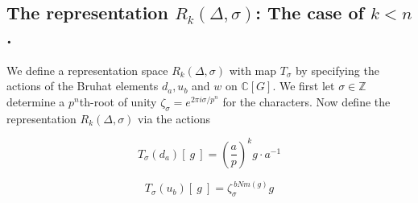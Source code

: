 \documentclass[12pt,reqno]{amsart}
\theoremstyle{remark}
\numberwithin{table}{section}
\newcommand{\C}{\mathbb C}
\newcommand{\Z}{\mathbb Z}
\begin{document}




\subsection{The representation  $R_k(\Delta, \sigma)$: The case of $k<n$.}\label{Representation}

We define a representation space $R_k(\Delta, \sigma)$  with map $T_\sigma$ by specifying the actions of the Bruhat elements $d_a, u_b$ and $w$ on $\C[G]$. We first let $\sigma \in \Z$ determine a $p^n$th-root of unity $\zeta_{\sigma} = e^{2 \pi i \sigma / p^n}$ for the characters. Now define the representation $R_k(\Delta, \sigma)$ via the actions %



\begin{equation}\label{eq:a}T_\sigma(d_a) \left [ \: g \:  \right ] = \left ( \frac{a}{p} \right )^k {g \cdot a^{-1}}\end{equation}


\begin{equation}\label{eq:b} T_\sigma(u_b) \left [ \: g \:  \right ] = \zeta_{\sigma}^{\: b Nm(g)} g \end{equation}

\end{document}
